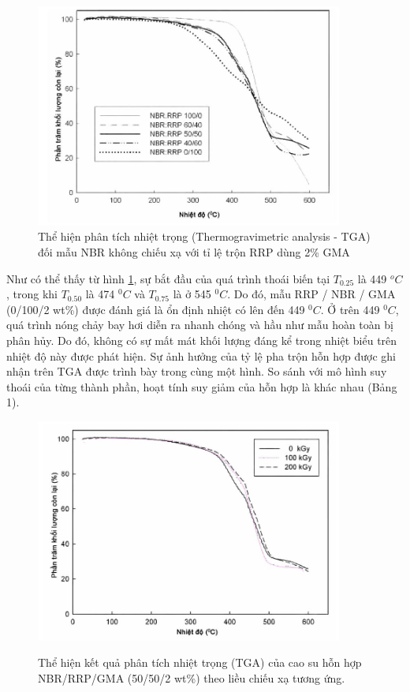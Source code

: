 \documentclass[12pt,a4paper]{article}
\begin{document}
	\begin{figure}
		\centering
			\includegraphics[width=0.9\textwidth]{6.JPG}
			\caption{Thể hiện phân tích nhiệt trọng (Thermogravimetric analysis - TGA) đối mẫu NBR không chiếu xạ với tỉ lệ trộn RRP dùng 2\% GMA}
			\label{fig:HINH4}
	\end{figure}
	
Như có thể thấy từ hình \ref{fig:HINH4}, sự bắt đầu của quá trình thoái biến tại $T_{0.25}$ là 449 $^oC$, trong khi $T_{0.50}$ là 474 $^0C$ và $T_{0.75}$ là ở 545 $^0C$. Do đó, mẫu RRP / NBR / GMA (0/100/2 wt\%) được đánh giá là ổn định nhiệt có lên đến 449 $^0C$. Ở trên 449 $^0C$, quá trình nóng chảy bay hơi diễn ra nhanh chóng và hầu như mẫu hoàn toàn bị phân hủy. Do đó, không có sự mất mát khối lượng đáng kể trong nhiệt biểu trên nhiệt độ này được phát hiện. Sự ảnh hưởng của tỷ lệ pha trộn hỗn hợp được ghi nhận trên TGA được trình bày trong cùng một hình. So sánh với mô hình suy thoái của từng thành phần, hoạt tính suy giảm của hỗn hợp là khác nhau (Bảng 1).\\

\begin{figure}
	\centering
	\includegraphics[width=0.9\textwidth]{7.JPG}
	\label{fig:HINH5}
			\caption{Thể hiện kết quả phân tích nhiệt trọng (TGA) của cao su hỗn hợp NBR/RRP/GMA (50/50/2 wt\%) theo liều chiếu xạ tương ứng.}
\end{figure}
		
\end{document}
